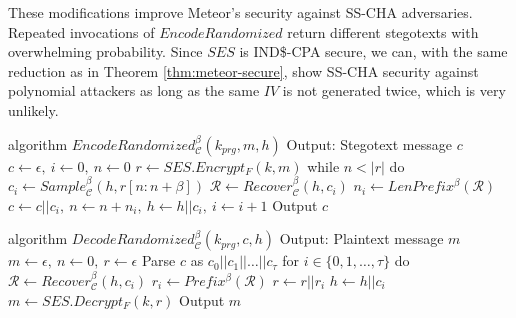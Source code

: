 These modifications improve Meteor's security against SS-CHA adversaries.
Repeated invocations of $EncodeRandomized$ return different stegotexts with overwhelming probability.
Since $SES$ is IND\$-CPA secure, we can, with the same reduction as in Theorem \ref{thm:meteor-secure}, show SS-CHA security against polynomial attackers as long as the same $IV$ is not generated twice, which is very unlikely.

\begin{Pseudocode}[float, caption={
$EncodeRandomized$ algorithm.
This algorithm differs from the original $Encode$ algorithm by using $SES$ to encrypt the message.
The ciphertext (which is indistinguishable from randomness and nondeterministic) is then used to sample from $\mathcal{C}_h$.
}, label={alg:encode-nd}]
algorithm $EncodeRandomized_{\mathcal{C}}^{\beta}(k_{prg}, m, h)$
  Output: Stegotext message $c$
  $c \leftarrow \epsilon,~ i \leftarrow 0,~ n \leftarrow 0$
  $r \leftarrow SES.Encrypt_F(k, m)$
  while $n < |r|$ do
    $c_i \leftarrow Sample_{\mathcal{C}}^\beta(h, r[n: n+\beta])$
    $\mathcal{R} \leftarrow Recover_{\mathcal{C}}^\beta(h, c_i)$
    $n_i \leftarrow LenPrefix^\beta(\mathcal{R})$
    $c \leftarrow c || c_i,~ n \leftarrow n+n_i,~ h \leftarrow h||c_i,~ i \leftarrow i + 1$
  Output $c$
\end{Pseudocode}
\begin{Pseudocode}[float, caption={
$DecodeRandomized$ algorithm.
This algorithm differs from the original $Decode$ algorithm by using $SES$ to decrypt the stegotext.
}, label={alg:decode-nd}]
algorithm $DecodeRandomized_{\mathcal{C}}^{\beta}(k_{prg}, c, h)$
  Output: Plaintext message $m$
  $m \leftarrow \epsilon,~ n \leftarrow 0,~ r \leftarrow \epsilon$
  Parse $c$ as $c_0 || c_1 || \dots || c_{\tau}$
  for $i \in \{ 0, 1, \dots, \tau \}$ do
    $\mathcal{R} \leftarrow Recover_{\mathcal{C}}^\beta(h, c_i)$
    $r_i \leftarrow Prefix^\beta(\mathcal{R})$
    $r \leftarrow r || r_i$
    $h \leftarrow h||c_i$
  $m \leftarrow SES.Decrypt_F(k, r)$
  Output $m$
\end{Pseudocode}